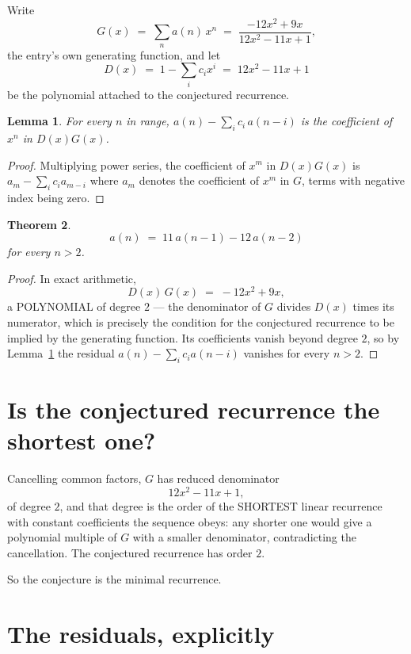 \documentclass[11pt,a4paper]{article}
\theoremstyle{plain}
\newtheorem{theorem}{Theorem}
\newtheorem{lemma}[theorem]{Lemma}
\theoremstyle{definition}
\begin{document}
Write
\[
G(x)\;=\;\sum_{n}a(n)\,x^{n}\;=\;\frac{- 12 x^{2} + 9 x}{12 x^{2} - 11 x + 1},
\]
the entry's own generating function, and let
\[
D(x)\;=\;1-\sum_i c_i x^{i}\;=\;12 x^{2} - 11 x + 1
\]
be the polynomial attached to the conjectured recurrence.

\begin{lemma}\label{lem:key}
For every $n$ in range, $a(n)-\sum_i c_i\,a(n-i)$ is the coefficient of $x^{n}$ in
$D(x)G(x)$.
\end{lemma}

\begin{proof}
Multiplying power series, the coefficient of $x^{m}$ in $D(x)G(x)$ is
$a_m-\sum_i c_i a_{m-i}$ where $a_m$ denotes the coefficient of $x^{m}$ in $G$, terms with
negative index being zero.
\end{proof}

\begin{theorem}
\[
a(n)\;=\;11\,a(n-1) - 12\,a(n-2)
\]
for every $n>2$.
\end{theorem}

\begin{proof}
In exact arithmetic,
\[
D(x)\,G(x)\;=\;- 12 x^{2} + 9 x,
\]
a POLYNOMIAL of degree $2$ --- the denominator of $G$ divides $D(x)$ times its numerator,
which is precisely the condition for the conjectured recurrence to be implied by the
generating function. Its coefficients vanish beyond degree $2$, so by
Lemma~\ref{lem:key} the residual $a(n)-\sum_ic_ia(n-i)$ vanishes for every
$n>2$.
\end{proof}

\section{Is the conjectured recurrence the shortest one?}

Cancelling common factors, $G$ has reduced denominator
\[
12 x^{2} - 11 x + 1,
\]
of degree $2$, and that degree is the order of the SHORTEST linear recurrence with
constant coefficients the sequence obeys: any shorter one would give a polynomial multiple of
$G$ with a smaller denominator, contradicting the cancellation. The conjectured recurrence has
order $2$.

So the conjecture is the minimal recurrence.

\section{The residuals, explicitly}
\end{document}
